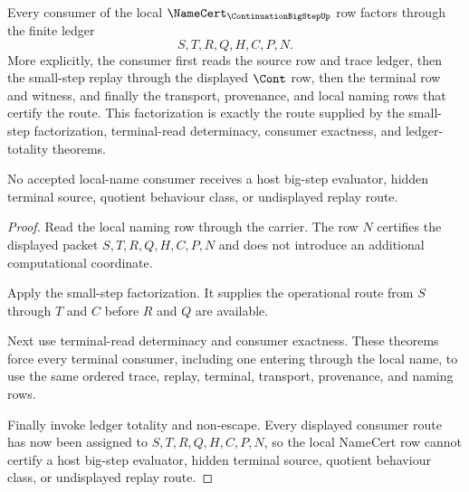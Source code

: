 \begin{theorem}
\label{thm:continuation-bigstep-ledger-factorization}
Every consumer of the local $\NameCert_{\ContinuationBigStepUp}$ row factors through the finite ledger
$$
S,T,R,Q,H,C,P,N.
$$
More explicitly, the consumer first reads the source row and trace ledger, then the small-step replay through the displayed $\Cont$ row, then the terminal row and witness, and finally the transport, provenance, and local naming rows that certify the route. This factorization is exactly the route supplied by the small-step factorization, terminal-read determinacy, consumer exactness, and ledger-totality theorems.

No accepted local-name consumer receives a host big-step evaluator, hidden terminal source, quotient behaviour class, or undisplayed replay route.
\end{theorem}
\begin{proof}
Read the local naming row through the carrier. The row $N$ certifies the displayed packet $S,T,R,Q,H,C,P,N$ and does not introduce an additional computational coordinate.

Apply the small-step factorization. It supplies the operational route from $S$ through $T$ and $C$ before $R$ and $Q$ are available.

Next use terminal-read determinacy and consumer exactness. These theorems force every terminal consumer, including one entering through the local name, to use the same ordered trace, replay, terminal, transport, provenance, and naming rows.

Finally invoke ledger totality and non-escape. Every displayed consumer route has now been assigned to $S,T,R,Q,H,C,P,N$, so the local NameCert row cannot certify a host big-step evaluator, hidden terminal source, quotient behaviour class, or undisplayed replay route.
\end{proof}

